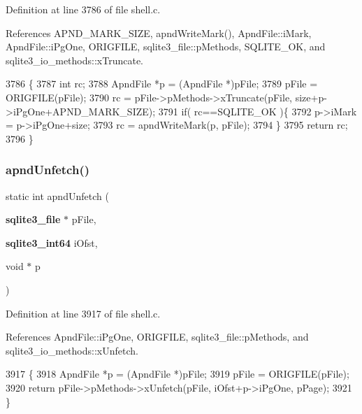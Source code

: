 Definition at line 3786 of file shell.\+c.



References A\+P\+N\+D\+\_\+\+M\+A\+R\+K\+\_\+\+S\+I\+ZE, apnd\+Write\+Mark(), Apnd\+File\+::i\+Mark, Apnd\+File\+::i\+Pg\+One, O\+R\+I\+G\+F\+I\+LE, sqlite3\+\_\+file\+::p\+Methods, S\+Q\+L\+I\+T\+E\+\_\+\+OK, and sqlite3\+\_\+io\+\_\+methods\+::x\+Truncate.


\begin{DoxyCode}
3786                                                                \{
3787   \textcolor{keywordtype}{int} rc;
3788   ApndFile *p = (ApndFile *)pFile;
3789   pFile = ORIGFILE(pFile);
3790   rc = pFile->pMethods->xTruncate(pFile, size+p->iPgOne+APND_MARK_SIZE);
3791   \textcolor{keywordflow}{if}( rc==SQLITE_OK )\{
3792     p->iMark = p->iPgOne+size;
3793     rc = apndWriteMark(p, pFile);
3794   \}
3795   \textcolor{keywordflow}{return} rc;
3796 \}
\end{DoxyCode}
\mbox{\label{shell_8c_a5cf8f7e6152b7c99955fa800bcb42ccb}} 
\subsubsection{apnd\+Unfetch()}
{\footnotesize\ttfamily static int apnd\+Unfetch (\begin{DoxyParamCaption}\item[{\textbf{ sqlite3\+\_\+file} $\ast$}]{p\+File,  }\item[{\textbf{ sqlite3\+\_\+int64}}]{i\+Ofst,  }\item[{void $\ast$}]{p }\end{DoxyParamCaption})\hspace{0.3cm}{\ttfamily [static]}}



Definition at line 3917 of file shell.\+c.



References Apnd\+File\+::i\+Pg\+One, O\+R\+I\+G\+F\+I\+LE, sqlite3\+\_\+file\+::p\+Methods, and sqlite3\+\_\+io\+\_\+methods\+::x\+Unfetch.


\begin{DoxyCode}
3917                                                                              \{
3918   ApndFile *p = (ApndFile *)pFile;
3919   pFile = ORIGFILE(pFile);
3920   \textcolor{keywordflow}{return} pFile->pMethods->xUnfetch(pFile, iOfst+p->iPgOne, pPage);
3921 \}
\end{DoxyCode}
\mbox{\label{shell_8c_ae2e239974dda66ff818d6b9dabb6129c}} 
